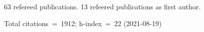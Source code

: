 63 refereed publications. 13 refeered publications as first author.

Total citations~=~1912; h-index~=~22 (2021-08-19)